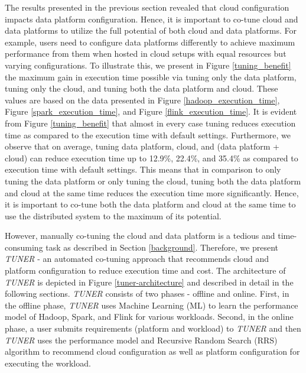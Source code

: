 \documentclass[3p]{elsarticle}
\begin{document}
The results presented in the previous section revealed that cloud configuration impacts data platform configuration. Hence, it is important to co-tune cloud and data platforms to utilize the full potential of both cloud and data platforms. For example, users need to configure data platforms differently to achieve maximum performance from them when hosted in cloud setups with equal resources but varying configurations. To illustrate this, we present in Figure \ref{tuning_benefit} the maximum gain in execution time possible via tuning only the data platform, tuning only the cloud, and tuning both the data platform and cloud. These values are based on the data presented in Figure \ref{hadoop_execution_time}, Figure \ref{spark_execution_time}, and Figure \ref{flink_execution_time}. It is evident from Figure \ref{tuning_benefit} that almost in every case tuning reduces execution time as compared to the execution time with default settings. Furthermore, we observe that on average, tuning data platform, cloud, and (data platform + cloud) can reduce execution time up to 12.9\%, 22.4\%, and 35.4\% as compared to execution time with default settings. This means that in comparison to only tuning the data platform or only tuning the cloud, tuning both the data platform and cloud at the same time reduces the execution time more significantly. Hence, it is important to co-tune both the data platform and cloud at the same time to use the distributed system to the maximum of its potential.

However, manually co-tuning the cloud and data platform is a tedious and time-consuming task as described in Section \ref{background}. Therefore, we present \textit{TUNER} - an automated co-tuning approach that recommends cloud and platform configuration to reduce execution time and cost. The architecture of \textit{TUNER} is depicted in Figure \ref{tuner-architecture} and described in detail in the following sections. \textit{TUNER} consists of two phases - offline and online. First, in the offline phase, \textit{TUNER} uses Machine Learning (ML) to learn the performance model of Hadoop, Spark, and Flink for various workloads. Second, in the online phase, a user submits requirements (platform and workload) to \textit{TUNER} and then \textit{TUNER} uses the performance model and Recursive Random Search (RRS) algorithm to recommend cloud configuration as well as platform configuration for executing the workload.
\end{document}
